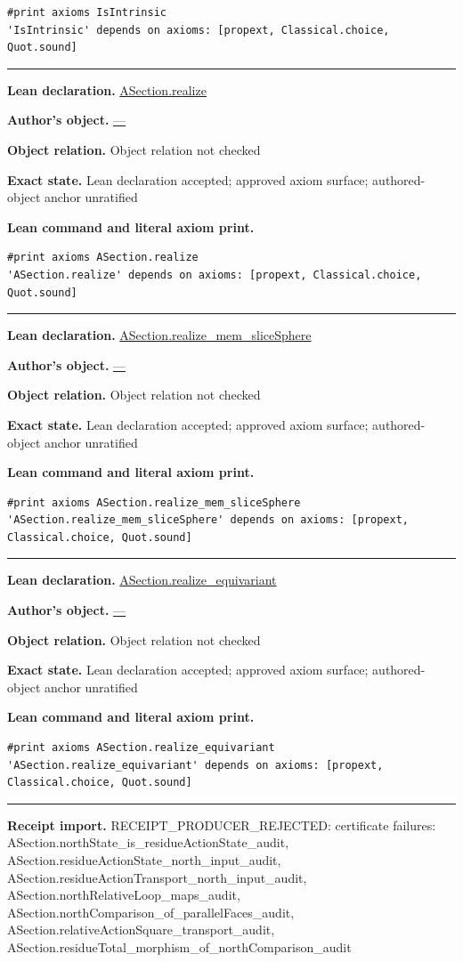 \documentclass[11pt]{article}
\theoremstyle{plain}
\theoremstyle{definition}
\theoremstyle{remark}
\begin{document}
\begin{tcolorbox}
\begin{Verbatim}[breaklines=true,breakanywhere=true,fontsize=\small]
#print axioms IsIntrinsic
'IsIntrinsic' depends on axioms: [propext, Classical.choice, Quot.sound]
\end{Verbatim}
\medskip\hrule\medskip
\textbf{Lean declaration.} \url{ASection.realize}
\par\textbf{Author's object.} \url{—}
\par\textbf{Object relation.} Object relation not checked
\par\textbf{Exact state.} Lean declaration accepted; approved axiom surface; authored-object anchor unratified
\par\smallskip\textbf{Lean command and literal axiom print.}
\begin{Verbatim}[breaklines=true,breakanywhere=true,fontsize=\small]
#print axioms ASection.realize
'ASection.realize' depends on axioms: [propext, Classical.choice, Quot.sound]
\end{Verbatim}
\medskip\hrule\medskip
\textbf{Lean declaration.} \url{ASection.realize_mem_sliceSphere}
\par\textbf{Author's object.} \url{—}
\par\textbf{Object relation.} Object relation not checked
\par\textbf{Exact state.} Lean declaration accepted; approved axiom surface; authored-object anchor unratified
\par\smallskip\textbf{Lean command and literal axiom print.}
\begin{Verbatim}[breaklines=true,breakanywhere=true,fontsize=\small]
#print axioms ASection.realize_mem_sliceSphere
'ASection.realize_mem_sliceSphere' depends on axioms: [propext, Classical.choice, Quot.sound]
\end{Verbatim}
\medskip\hrule\medskip
\textbf{Lean declaration.} \url{ASection.realize_equivariant}
\par\textbf{Author's object.} \url{—}
\par\textbf{Object relation.} Object relation not checked
\par\textbf{Exact state.} Lean declaration accepted; approved axiom surface; authored-object anchor unratified
\par\smallskip\textbf{Lean command and literal axiom print.}
\begin{Verbatim}[breaklines=true,breakanywhere=true,fontsize=\small]
#print axioms ASection.realize_equivariant
'ASection.realize_equivariant' depends on axioms: [propext, Classical.choice, Quot.sound]
\end{Verbatim}
\medskip\hrule\medskip
\textbf{Receipt import.} \textcolor{KgtRed}{RECEIPT\_PRODUCER\_REJECTED: certificate failures: ASection.northState\_is\_residueActionState\_audit, ASection.residueActionState\_north\_input\_audit, ASection.residueActionTransport\_north\_input\_audit, ASection.northRelativeLoop\_maps\_audit, ASection.northComparison\_of\_parallelFaces\_audit, ASection.relativeActionSquare\_transport\_audit, ASection.residueTotal\_morphism\_of\_northComparison\_audit}
\end{tcolorbox}
\end{document}
